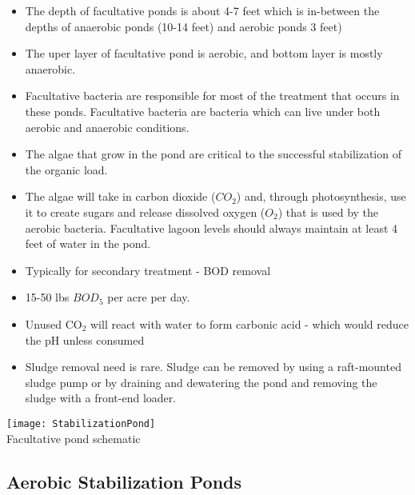 \begin{itemize}
\item The depth of facultative ponds is about 4-7 feet which is in-between the depths of anaerobic ponds (10-14 feet) and aerobic ponds 3 feet)
\item The uper layer of facultative pond is aerobic, and bottom layer is mostly anaerobic.
\item Facultative bacteria are responsible for most of the treatment that occurs in these ponds.  Facultative bacteria are bacteria which can live under both aerobic and anaerobic conditions.
\item The algae that grow in the pond are critical to the successful stabilization of the organic load. 
\item The algae will take in carbon dioxide ($CO_2$) and, through photosynthesis, use it to create sugars and release dissolved oxygen ($O_2$) that is used by the aerobic bacteria. Facultative lagoon levels should always maintain at least 4 feet of water in the pond.
\item Typically for secondary treatment - BOD removal
\item 15-50 lbs $BOD_5$ per acre per day.
\item Unused CO$_2$ will react with water to form carbonic acid - which would reduce the pH unless consumed
\item Sludge removal need is rare.  Sludge can be removed by using a raft-mounted sludge pump or by draining and dewatering the pond and removing the sludge with a front-end loader.
\end{itemize} 

				\begin{sidewaysfigure}
\begin{center}
\texttt{[image: StabilizationPond]}\\
Facultative pond schematic
\end{center}
				\end{sidewaysfigure}
				
\subsection{Aerobic Stabilization Ponds}
	
